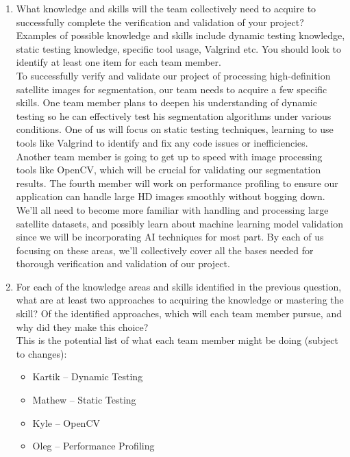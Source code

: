 \documentclass[12pt, titlepage]{article}
\begin{document}
\begin{enumerate}
      
    \item What knowledge and skills will the team collectively need to acquire to
    successfully complete the verification and validation of your project?
    Examples of possible knowledge and skills include dynamic testing knowledge,
    static testing knowledge, specific tool usage, Valgrind etc.  You should look to
    identify at least one item for each team member.\\
  
    To successfully verify and validate our project of processing high-definition satellite images for segmentation, our team needs to acquire a few specific skills. One team member plans to deepen his understanding of dynamic testing so he can effectively test his segmentation algorithms under various conditions. One of us will focus on static testing techniques, learning to use tools like Valgrind to identify and fix any code issues or inefficiencies. Another team member is going to get up to speed with image processing tools like OpenCV, which will be crucial for validating our segmentation results. The fourth member will work on performance profiling to ensure our application can handle large HD images smoothly without bogging down. We'll all need to become more familiar with handling and processing large satellite datasets, and possibly learn about machine learning model validation since we will be incorporating AI techniques for most part. By each of us focusing on these areas, we'll collectively cover all the bases needed for thorough verification and validation of our project.
  
  
    \item For each of the knowledge areas and skills identified in the previous
    question, what are at least two approaches to acquiring the knowledge or
    mastering the skill?  Of the identified approaches, which will each team
    member pursue, and why did they make this choice?\\
  
    This is the potential list of what each team member might be doing (subject to changes):
  
  \begin{itemize}
      \item Kartik -- Dynamic Testing
      \item Mathew -- Static Testing
      \item Kyle -- OpenCV
      \item Oleg -- Performance Profiling
  \end{itemize}
  

\end{enumerate}
\end{document}
